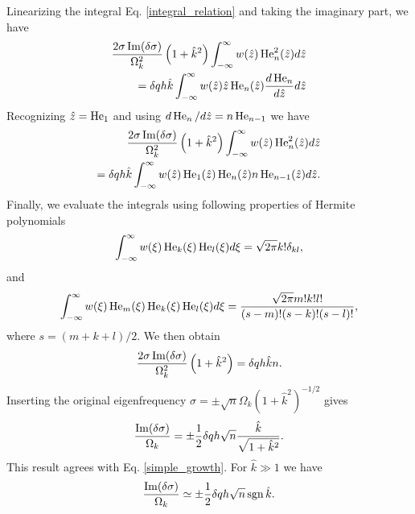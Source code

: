 Linearizing the integral Eq. \ref{integral_relation} and taking the
imaginary part, we have
\begin{align}
  \frac{2\sigma\operatorname{Im}(\delta\sigma)}{\Omega_k^2}
  \left(1+\hat{k}^2\right) \int_{-\infty}^{\infty} w(\hat{z})
  \operatorname{He}_n^2(\hat{z}) d\hat{z} \notag\\
  = \delta q h \hat{k} 
  \int_{-\infty}^{\infty}
  w(\hat{z})\hat{z}\operatorname{He}_n(\hat{z})\frac{d\operatorname{He}_n}{d\hat{z}} d\hat{z}
\end{align}
Recognizing $\hat{z} = \operatorname{He}_1$ and using $d\operatorname{He}_n/d\hat{z} = n
\operatorname{He}_{n-1}$ we have
 \begin{align}
   \frac{2\sigma\operatorname{Im}(\delta\sigma)}{\Omega_k^2}
   \left(1+\hat{k}^2\right) \int_{-\infty}^{\infty} w(\hat{z})
   \operatorname{He}_n^2(\hat{z}) d\hat{z} \notag\\
   =\delta q h \hat{k} 
   \int_{-\infty}^{\infty}
   w(\hat{z})\operatorname{He}_1(\hat{z})\operatorname{He}_n(\hat{z})n\operatorname{He}_{n-1}(\hat{z})d\hat{z}. 
 \end{align}
Finally, we evaluate the integrals using following properties of Hermite polynomials
\begin{align}
  \int_{-\infty}^{\infty}
  w(\xi) \operatorname{He}_k(\xi)\operatorname{He}_l(\xi) d\xi = \sqrt{2\pi}k!\delta_{kl}, 
\end{align}
and
\begin{align}
  \int_{-\infty}^{\infty}
  w(\xi) \operatorname{He}_m(\xi)\operatorname{He}_k(\xi)\operatorname{He}_l(\xi) d\xi =
  \frac{\sqrt{2\pi}m!k!l!}{(s-m)!(s-k)!(s-l)!}, 
\end{align}
where $s = (m+k+l)/2$. We then obtain
 \begin{align}
  \frac{2\sigma\operatorname{Im}(\delta\sigma)}{\Omega_k^2}
  \left(1+\hat{k}^2\right) = \delta q h \hat{k} n.
 \end{align}
Inserting the original eigenfrequency $\sigma = \pm
\sqrt{n}\Omega_k(1+\hat{k}^2)^{-1/2}$ gives
\begin{align}
  \frac{\operatorname{Im}(\delta\sigma)}{\Omega_k} = \pm \frac{1}{2}\delta q h
  \sqrt{n} \frac{\hat{k}}{\sqrt{1+\hat{k}^2}}. 
\end{align}
This result agrees with Eq. \ref{simple_growth}.  
For $\hat{k}\gg 1$ we have
\begin{align}
  \frac{\operatorname{Im}(\delta\sigma)}{\Omega_k} \simeq \pm \frac{1}{2}\delta q h
  \sqrt{n} \operatorname{sgn}{\hat{k}}. 
\end{align}